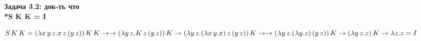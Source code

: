 \documentclass[12pt]{article}
\begin{document}
  \Large 
  \begin{center}
    \textbf{Задача 3.2: док-ть что \\*S K K = I}
  \end{center}
  
  $\\*S\,K\,K = (\lambda x\,y\,z. x \, z \, (y \, z)) \, K \, K \to
   \\* \to (\lambda y\,z.K\,z\,(y\,z))\,K
   \\* \to (\lambda y\,z.(\lambda x\,y.x)\,z\,(y\,z))\,K \to
   \\* \to (\lambda y\,z.(\lambda y.z)\,(y\,z))\,K
   \\* \to (\lambda y\,z.z)\,K
   \\* \to \lambda z.z = I$
  
\end{document}
